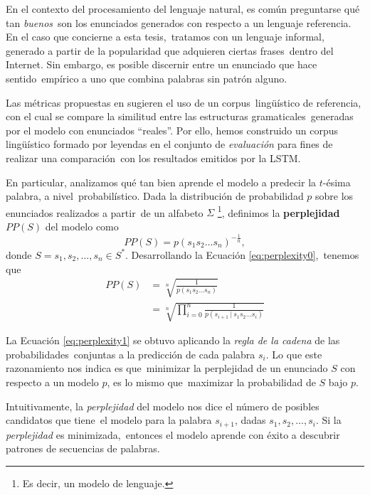 \noindent
En el contexto del procesamiento del lenguaje natural, es común preguntarse qué tan \emph{buenos}\
son los enunciados generados con respecto a un lenguaje referencia. En el caso que concierne a esta tesis,\
tratamos con un lenguaje informal, generado a partir de la popularidad que adquieren ciertas frases\
dentro del Internet. Sin embargo, es posible discernir entre un enunciado que hace sentido\
empírico a uno que combina palabras sin patrón alguno.\par
Las métricas propuestas en \cite{DBLP:journals/corr/VinyalsTBE16} sugieren el uso de un corpus\
lingüístico de referencia, con el cual se compare la similitud entre las estructuras gramaticales\
generadas por el modelo con enunciados ``reales''. Por ello, hemos construido un corpus lingüístico
formado por leyendas en el conjunto de \emph{evaluación} para fines de realizar una comparación\
con los resultados emitidos por la LSTM.\par
En particular, analizamos qué tan bien aprende el modelo a predecir la $t$-ésima palabra, a nivel\
probabilístico. Dada la distribución de probabilidad $p$ sobre los enunciados realizados a partir\
de un alfabeto $\Sigma$%
\footnote{
  Es decir, un modelo de lenguaje.
}, definimos la \textbf{perplejidad} $PP(S)$ del modelo como
\begin{equation}
  PP(S) = p(s_1 s_2 \ldots s_n) ^{-\frac{1}{n}}, \label{eq:perplexity0}
\end{equation}
donde $S = s_1, s_2, \ldots, s_n \in S^*$. Desarrollando la Ecuación \ref{eq:perplexity0},\
tenemos que
\begin{align}
  PP(S) &= \sqrt[n]{\frac{1}{p(s_1 s_2 \ldots s_n)}}\\
  &= \sqrt[n]{\prod_{i=0}^n \frac{1}{p(s_{i+1}\ |\ s_1 s_2 \ldots s_i)}} \label{eq:perplexity1}
\end{align}\par
La Ecuación \ref{eq:perplexity1} se obtuvo aplicando la \emph{regla de la cadena} de las probabilidades\
conjuntas a la predicción de cada palabra $s_i$. Lo que este razonamiento nos indica es que\
minimizar la perplejidad de un enunciado $S$ con respecto a un modelo $p$, es lo mismo que\
maximizar la probabilidad de $S$ bajo $p$.\par
Intuitivamente, la \emph{perplejidad} del modelo nos dice el número de posibles candidatos que tiene\
el modelo para la palabra $s_{i+1}$, dadas $s_1, s_2, \ldots, s_i$. Si la \emph{perplejidad} es minimizada,\
entonces el modelo aprende con éxito a descubrir patrones de secuencias de palabras.\par
